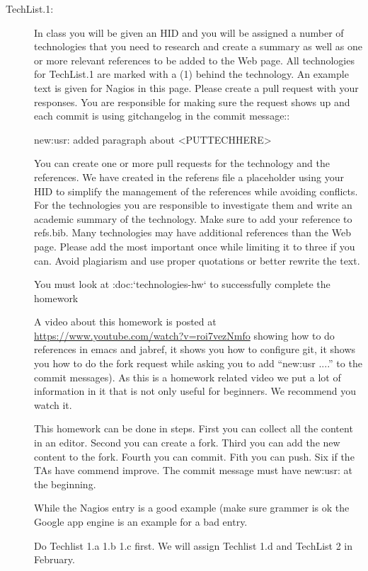 {\begin{description}

\item[TechList.1:] In class you will be given an HID and you will be assigned
  a number of technologies that you need to research and create a
  summary as well as one or more relevant references to be added to the
  Web page. All technologies for TechList.1 are marked with a (1)
  behind the technology.  An example text is given for Nagios in this
  page.  Please create a pull request with your responses. You are
  responsible for making sure the request shows up and each commit is
  using gitchangelog in the commit message::

    new:usr: added paragraph about <PUTTECHHERE>

  You can create one or more pull requests for the technology and the
  references. We have created in the referens file a placeholder using
  your HID to simplify the management of the references while avoiding
  conflicts.  For the technologies you are responsible to investigate
  them and write an academic summary of the technology. Make sure to
  add your reference to refs.bib.  Many technologies may have
  additional references than the Web page. Please add the most
  important once while limiting it to three if you can. Avoid
  plagiarism and use proper quotations or better rewrite the text.

  You must look at :doc:`technologies-hw` to successfully complete the
  homework

  A video about this homework is posted at
  \url{https://www.youtube.com/watch?v=roi7vezNmfo} showing how to
  do references in emacs and jabref, it shows you how to configure
  git, it shows you how to do the fork request while asking you to add
  ``new:usr ....'' to the commit messages). As this is a homework
  related video we put a lot of information in it that is not only
  useful for beginners. We recommend you watch it.


  This homework can be done in steps. First you can collect all the
  content in an editor. Second you can create a fork. Third you can
  add the new content to the fork. Fourth you can commit. Fith you
  can push. Six if the TAs have commend improve. The commit message
  must have new:usr: at the beginning.

  While the Nagios entry is a good example (make sure grammer is ok
  the Google app engine is an example for a bad entry.

  Do Techlist 1.a 1.b 1.c first. We  will assign Techlist 1.d and
  TechList 2 in February.


\end{description}}
